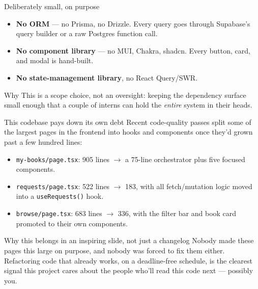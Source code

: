 \documentclass[aspectratio=169,11pt]{beamer}
\newcommand{\code}[1]{\textcolor{olkTealDark}{\texttt{#1}}}
\newcommand{\pathname}[1]{\textcolor{olkSlateLight}{\texttt{#1}}}
\begin{document}
\begin{frame}{Deliberately small, on purpose}
  \begin{itemize}
    \item \textbf{No ORM} --- no Prisma, no Drizzle. Every query goes through Supabase's query builder or a raw Postgres function call.
    \item \textbf{No component library} --- no MUI, Chakra, shadcn. Every button, card, and modal is hand-built.
    \item \textbf{No state-management library}, no React Query/SWR.
  \end{itemize}
  \vfill
  \begin{block}{Why}
    This is a scope choice, not an oversight: keeping the dependency surface small enough that a couple of interns can hold the \emph{entire} system in their heads.
  \end{block}
\end{frame}

\begin{frame}{This codebase pays down its own debt}
  Recent code-quality passes split some of the largest pages in the frontend into hooks and components once they'd grown past a few hundred lines:
  \begin{itemize}
    \item \pathname{my-books/page.tsx}: 905 lines $\to$ a 75-line orchestrator plus five focused components.
    \item \pathname{requests/page.tsx}: 522 lines $\to$ 183, with all fetch/mutation logic moved into a \code{useRequests()} hook.
    \item \pathname{browse/page.tsx}: 683 lines $\to$ 336, with the filter bar and book card promoted to their own components.
  \end{itemize}
  \vfill
  \begin{alertblock}{Why this belongs in an inspiring slide, not just a changelog}
    Nobody made these pages this large on purpose, and nobody was forced to fix them either. Refactoring code that already works, on a deadline-free schedule, is the clearest signal this project cares about the people who'll read this code next --- possibly you.
  \end{alertblock}
\end{frame}
\end{document}
